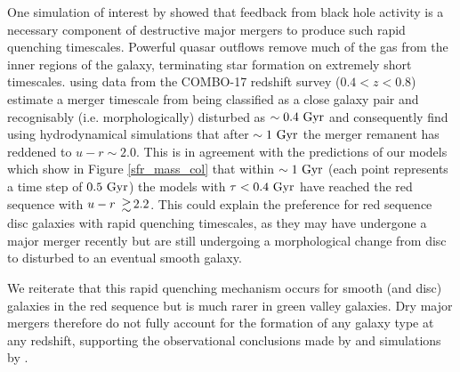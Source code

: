 \documentclass[useAMS,usenatbib]{mn2e}
\begin{document}
One simulation of interest by \citet{Springel05} showed that feedback from black hole activity is a necessary component of destructive major mergers to produce such rapid quenching timescales. Powerful quasar outflows remove much of the gas from the inner regions of the galaxy, terminating star formation on extremely short timescales. \citet{Bell06} using data from the COMBO-17 redshift survey ($0.4 < z < 0.8$) estimate a merger timescale from being classified as a close galaxy pair and recognisably (i.e. morphologically) disturbed as $\sim 0.4~\rm{Gyr}$ and \citet{Springel05} consequently find using hydrodynamical simulations that after $\sim1~\rm{Gyr}$ the merger remanent has reddened to $u-r \sim 2.0$. This is in agreement with the predictions of our models which show in Figure \ref{sfr_mass_col} that within $\sim1~\rm{Gyr}$ (each point represents a time step of $0.5~\rm{Gyr}$) the models with $\tau < 0.4~\rm{Gyr}$ have reached the red sequence with $u-r ~\ga 2.2$. This could explain the preference for red sequence disc galaxies with rapid quenching timescales, as they may have undergone a major merger recently but are still undergoing a morphological change from disc to disturbed to an eventual smooth galaxy. 



We reiterate that this rapid quenching mechanism occurs for smooth (and disc) galaxies in the red sequence but is much rarer in green valley galaxies. Dry major mergers therefore do not fully account for the formation of any galaxy type at any redshift, supporting the observational conclusions made by \citet{Bell07,Bundy07, Kav14} and simulations by \citet{Genel08}.
\end{document}
